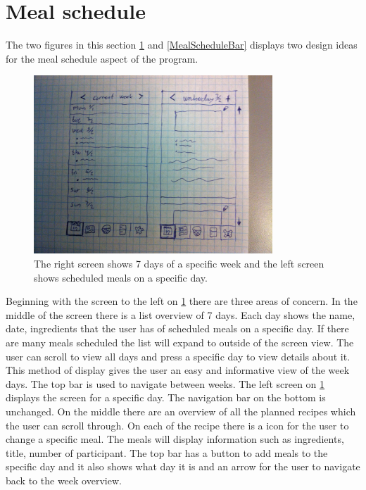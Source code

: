 \section{Meal schedule}

The two figures in this section \cref{MealScheduleList} and \cref{MealScheduleBar} displays two design ideas for the meal schedule aspect of the program.

\begin{figure}[H]
	\includegraphics[width=0.8\textwidth]{Grafik/FoodPlanner/FinalMealScheduleSketch1}
	\caption{The right screen shows 7 days of a specific week and the left screen shows scheduled meals on a specific day.}
	\label{MealScheduleList}
\end{figure}

Beginning with the screen to the left on \cref{MealScheduleList} there are three areas of concern. In the middle of the screen there is a list overview of 7 days. Each day shows the name, date, ingredients that the user has of scheduled meals on a specific day. If there are many meals scheduled the list will expand to outside of the screen view. The user can scroll to view all days and press a specific day to view details about it. This method of display gives the user an easy and informative view of the week days. The top bar is used to navigate between weeks. The left screen on \cref{MealScheduleList} displays the screen for a specific day. The navigation bar on the bottom is unchanged. On the middle there are an overview of all the planned recipes which the user can scroll through. On each of the recipe there is a icon for the user to change a specific meal. The meals will display information such as ingredients, title, number of participant. The top bar has a button to add meals to the specific day and it also shows what day it is and an arrow for the user to navigate back to the week overview.  


